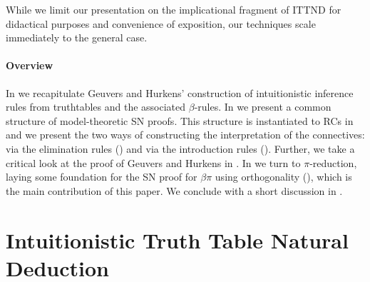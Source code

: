 \documentclass[a4paper,USenglish,cleveref, autoref, thm-restate]{lipics-v2019}
\begin{document}
While we limit our presentation on the implicational fragment of ITTND
for didactical purposes and convenience of exposition, our techniques
scale immediately to the general case.

\paragraph*{Overview}
%
In  we recapitulate Geuvers and Hurkens' construction of
intuitionistic inference rules from truthtables and the associated
$\beta$-rules.
%
In  we present a common structure of model-theoretic
SN proofs.
%
This structure is instantiated to RCs in  and we present
the two ways of constructing the interpretation of the connectives:
via the elimination rules () and via the
introduction rules ().  Further, we take a
critical look at the proof of Geuvers and Hurkens
\cite{geuversHurkens:types17} in .
%
In  we turn to $\pi$-reduction, laying some foundation
for the SN proof for $\beta\pi$ using orthogonality
(), which is the main contribution of this paper.
%
We conclude with a short discussion in .


\section{Intuitionistic Truth Table Natural Deduction}
\label{sec:nd}
\end{document}
